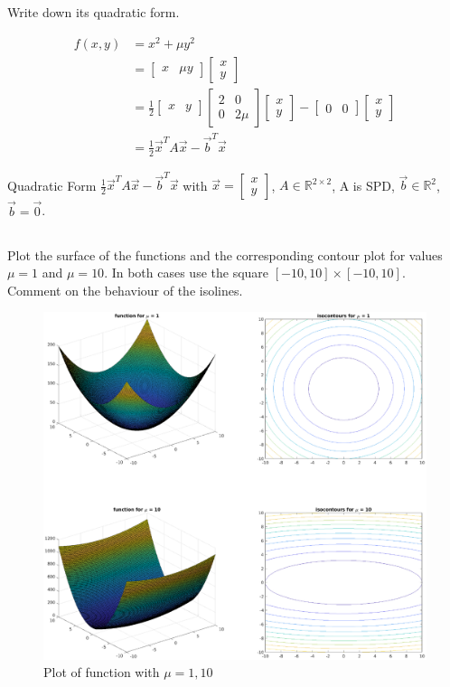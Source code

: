\documentclass[unicode,11pt,a4paper,oneside,numbers=endperiod,openany]{scrartcl}
\newcommand{\myvec}[1]{\begin{bmatrix} #1 \end{bmatrix}}
\newcommand{\myex}[1]{\begin{equation*}\begin{aligned} #1 \end{aligned}\end{equation*}}
\newcommand{\myexthreeA}{\myvec{2 & 0 \\ 0 & 2\mu}}
\begin{document}
\subsection{}
Write down its quadratic form. \newline

\myex{
    f(x, y) 
    & = x^2 + \mu y^2 \\
    & = \myvec{x & \mu y} \myvec{x \\ y} \\
    & = \frac{1}{2} \myvec{x & y} \myexthreeA \myvec{x \\ y} - \myvec{0 & 0} \myvec{x \\ y} \\
    & = \frac{1}{2} \vec{x}^T A \vec{x} - \vec{b}^T \vec{x}
}

Quadratic Form $\frac{1}{2} \vec{x}^T A \vec{x} - \vec{b}^T \vec{x}$ 
with $\vec{x} = \myvec{x \\ y}$, $A \in \mathbb{R}^{2 \times 2}$, A is SPD, $\vec{b} \in \mathbb{R}^2$, $\vec{b} = \vec{0}$.

\subsection{}
Plot the surface of the functions and the corresponding contour plot for values $\mu = 1$ and $\mu = 10$. 
In both cases use the square $[-10, 10] \times [-10, 10]$.
Comment on the behaviour of the isolines.

\begin{figure}[H]
    \centering
    \caption{Plot of function with $\mu = 1,10$}
    \label{fig:ex3-2}
    \includegraphics[width=\textwidth, trim={3cm 3cm 3cm 1cm}, clip]{./figures/ex3-2.eps}
\end{figure}
\end{document}
